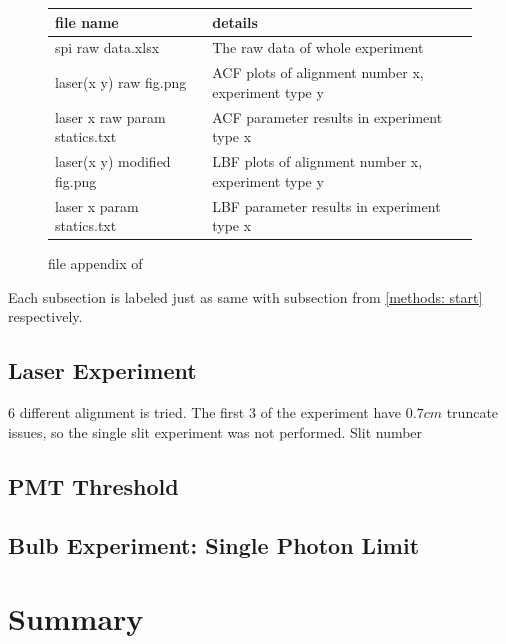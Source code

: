 \documentclass{article}
\begin{document}
\begin{figure}[H]
    \begin{tabular}{  m{5.2cm} | m{8.7cm} } 

      file name& details \\ 
      \hline
      \hline
        spi raw data.xlsx & The raw data of whole experiment\\
      \hline
        laser(x y) raw fig.png & ACF plots of alignment number x, experiment type y\\
      \hline
        laser x raw param statics.txt & ACF parameter results in experiment type x\\
      \hline
        laser(x y) modified fig.png & LBF plots of alignment number x, experiment type y\\
      \hline
        laser x param statics.txt & LBF parameter results in experiment type x
    \end{tabular}
    \caption{file appendix of \cite{github}}
    \label{fig: file_appendix}
\end{figure}

Each subsection is labeled just as same with subsection from \ref{methods: start} respectively.
\subsection{Laser Experiment}
6 different alignment is tried.
The first 3 of the experiment have $0.7 cm$ truncate issues, so the single slit experiment was not performed.
Slit number 


\subsection{PMT Threshold}

\subsection{Bulb Experiment: Single Photon Limit}

\section{Summary}






\end{document}

